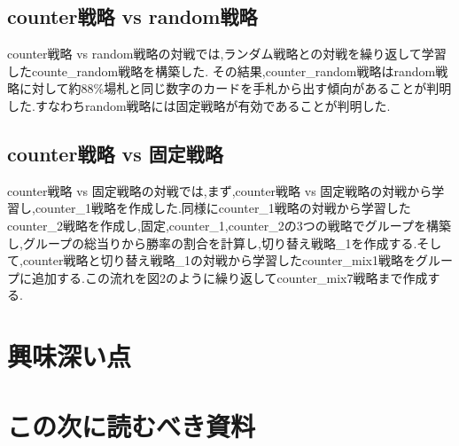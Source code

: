 \documentclass{jarticle}     %
\begin{document}
\subsection*{counter戦略 vs random戦略}
counter戦略 vs random戦略の対戦では,ランダム戦略との対戦を繰り返して学習したcounte\_random戦略を構築した.
その結果,counter\_random戦略はrandom戦略に対して約88\%場札と同じ数字のカードを手札から出す傾向があることが判明した.すなわちrandom戦略には固定戦略が有効であることが判明した.
\subsection*{counter戦略 vs 固定戦略}
counter戦略 vs 固定戦略の対戦では,まず,counter戦略 vs 固定戦略の対戦から学習し,counter\_1戦略を作成した.同様にcounter\_1戦略の対戦から学習したcounter\_2戦略を作成し,固定,counter\_1,counter\_2の3つの戦略でグループを構築し,グループの総当りから勝率の割合を計算し,切り替え戦略\_1を作成する.そして,counter戦略と切り替え戦略\_1の対戦から学習したcounter\_mix1戦略をグループに追加する.この流れを図2のように繰り返してcounter\_mix7戦略まで作成する.


\section*{興味深い点}

\section*{この次に読むべき資料}




\end{document}
